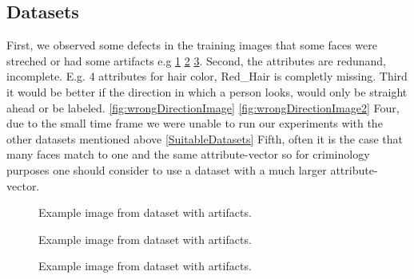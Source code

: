 \documentclass[12pt, a4paper]{article}
\begin{document}
\subsection{Datasets}
First, we observed some defects in the training images that some faces were streched or had some artifacts e.g \ref{fig:badDatasetImage} \ref{fig:badDatasetImage2} \ref{fig:badDatasetImage3}.
Second, the attributes are redunand, incomplete. E.g. 4 attributes for hair color, Red\_Hair is completly missing. 
Third it would be better if the direction in which a person looks, would only be straight ahead or be labeled. \ref{fig:wrongDirectionImage} \ref{fig:wrongDirectionImage2}
Four, due to the small time frame we were unable to run our experiments with the other datasets mentioned above \ref{SuitableDatasets}
Fifth, often it is the case that many faces match to one and the same attribute-vector so for criminology purposes one should consider to use a dataset with a much larger attribute-vector.
\begin{figure}
    \caption{Example image from dataset with artifacts.}
    \label{fig:badDatasetImage}
\end{figure}
\begin{figure}
    \caption{Example image from dataset with artifacts.}
    \label{fig:badDatasetImage2}
\end{figure}
\begin{figure}
    \caption{Example image from dataset with artifacts.}
    \label{fig:badDatasetImage3}
\end{figure}
\end{document}
